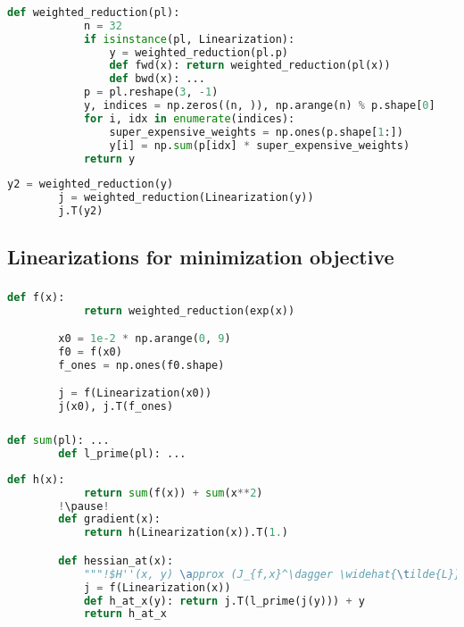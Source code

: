 \documentclass[aspectratio=169,xcolor=dvipsnames]{beamer}
\begin{document}
\begin{frame}[fragile]
	\frametitle{\insertsection}
	\framesubtitle{\insertsubsection}

	\begin{lstlisting}[language=python,escapechar=!]
		def weighted_reduction(pl):
			n = 32
			if isinstance(pl, Linearization):
				y = weighted_reduction(pl.p)
				def fwd(x): return weighted_reduction(pl(x))
				def bwd(x): ...
			p = pl.reshape(3, -1)
			y, indices = np.zeros((n, )), np.arange(n) % p.shape[0]
			for i, idx in enumerate(indices):
				super_expensive_weights = np.ones(p.shape[1:])
				y[i] = np.sum(p[idx] * super_expensive_weights)
			return y
	\end{lstlisting}

	\pause
	\begin{lstlisting}[language=python,escapechar=!]
		y2 = weighted_reduction(y)
		j = weighted_reduction(Linearization(y))
		j.T(y2)
	\end{lstlisting}

\end{frame}

\subsection{Linearizations for minimization objective}
\begin{frame}[fragile]
	\frametitle{\insertsection}
	\framesubtitle{\insertsubsection}

	\begin{lstlisting}[language=python,escapechar=!]
		def f(x):
			return weighted_reduction(exp(x))

		x0 = 1e-2 * np.arange(0, 9)
		f0 = f(x0)
		f_ones = np.ones(f0.shape)

		j = f(Linearization(x0))
		j(x0), j.T(f_ones)
	\end{lstlisting}

\end{frame}

\begin{frame}[fragile]
	\frametitle{\insertsection}
	\framesubtitle{\insertsubsection}

	\begin{lstlisting}[language=python,escapechar=!]
		def sum(pl): ...
		def l_prime(pl): ...
	\end{lstlisting}

	\vspace{1em}
	\begin{lstlisting}[language=python,escapechar=!]
		def h(x):
			return sum(f(x)) + sum(x**2)
		!\pause!
		def gradient(x):
			return h(Linearization(x)).T(1.)

		def hessian_at(x):
			"""!$H''(x, y) \approx (J_{f,x}^\dagger \widehat{\tilde{L}} J_{f,x} + 1)(y)$!"""
			j = f(Linearization(x))
			def h_at_x(y): return j.T(l_prime(j(y))) + y
			return h_at_x
	\end{lstlisting}

\end{frame}
\end{document}
